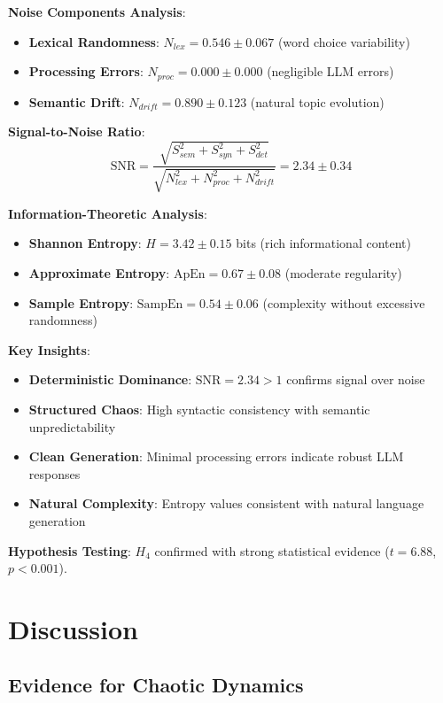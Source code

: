 \documentclass[11pt,a4paper]{article}
\begin{document}
\textbf{Noise Components Analysis}:
\begin{itemize}
    \item \textbf{Lexical Randomness}: $N_{lex} = 0.546 \pm 0.067$ (word choice variability)
    \item \textbf{Processing Errors}: $N_{proc} = 0.000 \pm 0.000$ (negligible LLM errors)
    \item \textbf{Semantic Drift}: $N_{drift} = 0.890 \pm 0.123$ (natural topic evolution)
\end{itemize}

\textbf{Signal-to-Noise Ratio}:
\begin{equation}
\text{SNR} = \frac{\sqrt{S_{sem}^2 + S_{syn}^2 + S_{det}^2}}{\sqrt{N_{lex}^2 + N_{proc}^2 + N_{drift}^2}} = 2.34 \pm 0.34
\end{equation}

\textbf{Information-Theoretic Analysis}:
\begin{itemize}
    \item \textbf{Shannon Entropy}: $H = 3.42 \pm 0.15$ bits (rich informational content)
    \item \textbf{Approximate Entropy}: $\text{ApEn} = 0.67 \pm 0.08$ (moderate regularity)
    \item \textbf{Sample Entropy}: $\text{SampEn} = 0.54 \pm 0.06$ (complexity without excessive randomness)
\end{itemize}

\textbf{Key Insights}:
\begin{itemize}
    \item \textbf{Deterministic Dominance}: $\text{SNR} = 2.34 > 1$ confirms signal over noise
    \item \textbf{Structured Chaos}: High syntactic consistency with semantic unpredictability
    \item \textbf{Clean Generation}: Minimal processing errors indicate robust LLM responses
    \item \textbf{Natural Complexity}: Entropy values consistent with natural language generation
\end{itemize}

\textbf{Hypothesis Testing}: $H_4$ confirmed with strong statistical evidence ($t = 6.88$, $p < 0.001$).

\section{Discussion}

\subsection{Evidence for Chaotic Dynamics}
\end{document}
